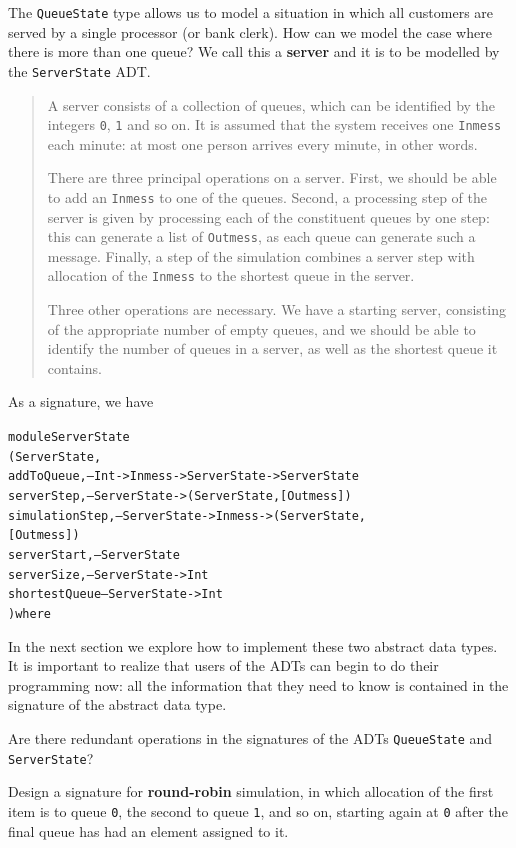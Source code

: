The \texttt{QueueState} type allows us to model a situation in which all
customers are served by a single processor (or bank clerk). How can we model
the case where there is more than one queue? We call this a \textbf{server}
and it is to be modelled by the \texttt{ServerState} ADT.
\begin{quote}
A server consists of a collection of queues, which can be identified by
the integers \texttt{0}, \texttt{1} and so on. It is assumed that the system
receives one \texttt{Inmess} each minute: at most one person arrives every
minute, in other words. 
 
There are three principal operations on a server.
First, we should be able to add an \texttt{Inmess} to one of the queues.
Second, a processing step of the server is given by processing each of the
constituent queues by one step: this can generate a list of \texttt{Outmess}, as
each queue can generate such a message. Finally, a step of the simulation
combines a server step with allocation of the \texttt{Inmess} to the shortest
queue in the server.

Three other operations are necessary. We have a starting server, consisting
of the appropriate number of empty queues, and we should be able to identify
the number of queues in a server, as well as the shortest queue it contains.

\end{quote}
\vspace{5pt}

As a signature, we have
\begin{alltt}
module ServerState 
  ( ServerState ,
    addToQueue,     -- Int -> Inmess -> ServerState -> ServerState
    serverStep,     -- ServerState -> ( ServerState , [Outmess] )
    simulationStep, -- ServerState -> Inmess -> ( ServerState , 
                                                  [Outmess] ) 
    serverStart,    -- ServerState
    serverSize,     -- ServerState -> Int
    shortestQueue   -- ServerState -> Int
  ) where
\end{alltt}
In the next section we explore how to implement these two abstract data types.
It is important to realize that users of the ADTs can begin to do their
programming now: all the information that they need to know is contained
in the signature of the abstract data type.

\begin{exercises}
\item
Are there redundant operations in the signatures of the ADTs 
\texttt{QueueState} and \texttt{ServerState}?

\item
Design a signature for \textbf{round-robin} simulation,
in which allocation of the first item is to queue \texttt{0}, the second to queue
\texttt{1}, and so on, starting again at \texttt{0} after the final queue has had an 
element assigned to it. 
\end{exercises}

